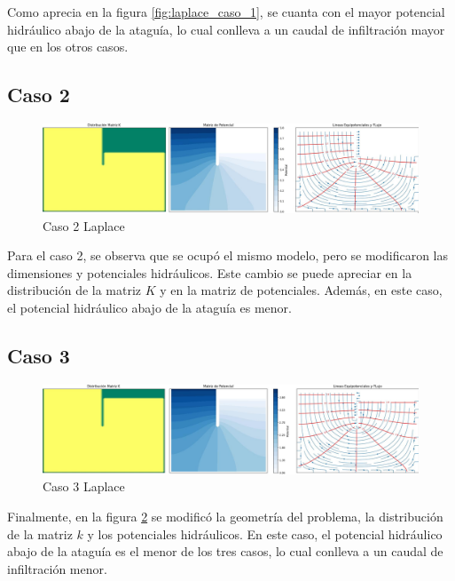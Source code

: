 Como aprecia en la figura \ref{fig:laplace_caso_1}, se cuanta con el mayor potencial hidráulico abajo de la ataguía, lo cual conlleva a un caudal de infiltración mayor que en los otros casos.

\subsection{Caso 2}

\begin{figure}[H]
    \centering
    \includegraphics[width=\textwidth]{GRAFICOS/laplace_caso_2.jpg}
    \caption{Caso 2 Laplace}
    \label{fig:laplace_caso_2}
\end{figure}

Para el caso 2, se observa que se ocupó el mismo modelo, pero se modificaron las dimensiones y potenciales hidráulicos. Este cambio se puede apreciar en la distribución de la matriz \(K\) y en la matriz de potenciales. Además, en este caso, el potencial hidráulico abajo de la ataguía es menor.

\subsection{Caso 3}

\begin{figure}[H]
    \centering
    \includegraphics[width=\textwidth]{GRAFICOS/laplace_caso_3.jpg}
    \caption{Caso 3 Laplace}
    \label{fig:laplace_caso_3}
\end{figure}

Finalmente, en la figura \ref{fig:laplace_caso_3} se modificó la geometría del problema, la distribución de la matriz \(k\) y los potenciales hidráulicos. En este caso, el potencial hidráulico abajo de la ataguía es el menor de los tres casos, lo cual conlleva a un caudal de infiltración menor.

